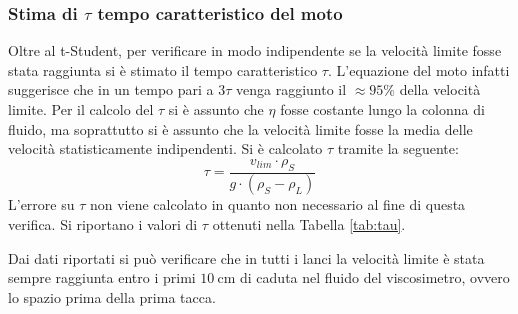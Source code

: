 \documentclass[a4paper,11pt,oneside]{article}
\begin{document}
\subsubsection*{Stima di $\tau$ tempo caratteristico del moto}
Oltre al t-Student, per verificare in modo indipendente se la velocità limite fosse stata raggiunta si è stimato il tempo caratteristico $\tau$. L'equazione del moto infatti suggerisce che in un tempo pari a  $3\tau$ venga raggiunto il $\approx 95\%$ della velocità limite.
Per il calcolo del $\tau$ si è assunto che $\eta$ fosse costante lungo la colonna di fluido, ma soprattutto si è assunto che la velocità limite fosse la media delle velocità statisticamente indipendenti.
Si è calcolato $\tau$ tramite la seguente:
\begin{equation*}
    \tau = \frac{v_{lim} \cdot \rho_{S}}{g \cdot (\rho_{S} - \rho_{L})}
\end{equation*}
L'errore su $\tau$ non viene calcolato in quanto non necessario al fine di questa verifica.
Si riportano i valori di $\tau$ ottenuti nella Tabella \ref{tab:tau}.
\begin{table}[h!]
\centering
{}
    \caption{Tempo caratteristico $\tau$}
    \label{tab:tau}
\end{table}

Dai dati riportati si può verificare che in tutti i lanci la velocità limite è stata sempre raggiunta entro i primi $\SI{10}{\centi\meter}$ di caduta nel fluido del viscosimetro, ovvero lo spazio prima della prima tacca.%
\end{document}

